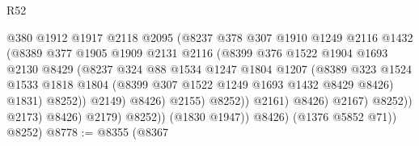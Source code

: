 \begin{lexlean}{R52}
\begin{coremodule}
                                      @380
                                      @1912
                                      @1917
                                      @2118
                                      @2095
                                      (@8237
                                        @378
                                        @307
                                        @1910
                                        @1249
                                        @2116
                                        @1432
                                        (@8389
                                          @377
                                          @1905
                                          @1909
                                          @2131
                                          @2116
                                          (@8399
                                            @376
                                            @1522
                                            @1904
                                            @1693
                                            @2130
                                            @8429
                                            (@8237
                                              @324
                                              @88
                                              @1534
                                              @1247
                                              @1804
                                              @1207
                                              (@8389
                                                @323
                                                @1524
                                                @1533
                                                @1818
                                                @1804
                                                (@8399 @307 @1522 @1249 @1693 @1432 @8429 @8426)
                                                @1831)
                                              @8252))
                                          @2149)
                                        @8426)
                                      @2155)
                                    @8252))
                                @2161)
                              @8426)
                            @2167)
                          @8252))
                      @2173)
                    @8426)
                  @2179)
                @8252))
            (@1830 @1947))
          @8426)
        (@1376 @5852 @71))
      @8252)
@8778 := @8355
    (@8367

\end{coremodule}
\end{lexlean}
